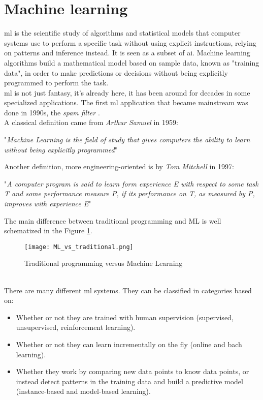 \section{Machine learning}\label{ML}
\gls{ml} is the scientific study of algorithms and statistical models that computer systems use to perform a specific task without using explicit instructions, relying on patterns and inference instead. It is seen as a subset of \gls{ai}. Machine learning algorithms build a mathematical model based on sample data, known as "training data", in order to make predictions or decisions without being explicitly programmed to perform the task.
\\ \indent
\gls{ml} is not just fantasy, it's already here, it has been around for decades in some specialized applications. The first \gls{ml} application that became mainstream was done in 1990s, the \textit{spam filter} \cite{geron2019hands}.
\\
A classical definition came from \textit{Arthur Samuel} in 1959:
\begin{center}
"\textit{Machine Learning is the field of study that gives computers the ability to learn without being explicitly programmed}" 
\end{center}
Another definition, more engineering-oriented is by \textit{Tom Mitchell} in 1997:
\begin{center}
"\textit{A computer program is said to learn form experience E with respect to some task T and some performance measure P, if its performance on T, as measured by P, improves with experience E}"
\end{center}
The main difference between traditional programming and ML is well schematized in the Figure \ref{fig:ML_vs_traditional}.
\begin{figure}[h]
    \centering
    \texttt{[image: ML\_vs\_traditional.png]} 
	\caption{Traditional programming versus Machine Learning}
    \label{fig:ML_vs_traditional}
\end{figure}
\\
There are many different \gls{ml} systems. They can be classified in categories based on:
\begin{itemize}
	\item Whether or not they are trained with human supervision (supervised, unsupervised, reinforcement learning).
	\item Whether or not they can learn incrementally on the fly (online and bach learning).
	\item Whether they work by comparing new data points to know data points, or instead detect patterns in the training data and build a predictive model (instance-based and model-based learning).
\end{itemize}
